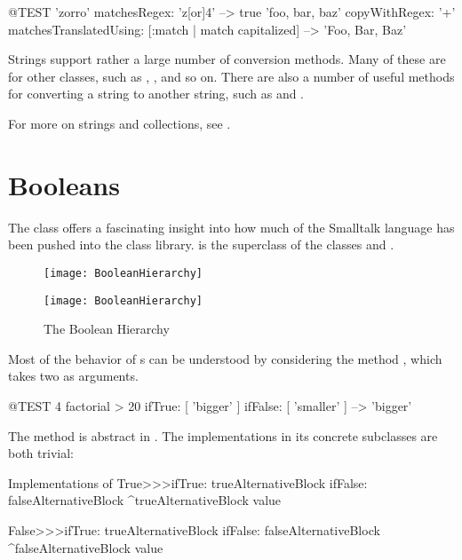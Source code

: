 \documentclass[a4paper,10pt,twoside]{book}
\begin{document}
\begin{code}{@TEST}
'zorro' matchesRegex: 'z[or]{4}' --> true
'foo, bar, baz' copyWithRegex: '\w+' matchesTranslatedUsing: [:match | match capitalized] --> 'Foo, Bar, Baz'
\end{code}

Strings support rather a large number of conversion methods.
Many of these are  for other classes, such as , , and so on.
There are also a number of useful methods for converting a string to another string, such as  and .

For more on strings and collections, see .


\section{Booleans}

The class  offers a fascinating insight into how much of the Smalltalk language has been pushed into the class library.
 is the  superclass of the  classes  and .

\begin{figure}[ht]
\ifluluelse
	{\centerline {\texttt{[image: BooleanHierarchy]}}}
	{\centerline {\texttt{[image: BooleanHierarchy]}}}
\caption{The Boolean Hierarchy \label{fig:booleans}}
\end{figure}

Most of the behavior of s can be understood by considering the method , which takes two  as arguments.

\begin{code}{@TEST}
4 factorial > 20 ifTrue: [ 'bigger' ] ifFalse: [ 'smaller' ] --> 'bigger'
\end{code}

The method is abstract in .
The implementations in its concrete subclasses are both trivial:

\begin{method}{Implementations of }
True>>>ifTrue: trueAlternativeBlock ifFalse: falseAlternativeBlock 
    ^trueAlternativeBlock value

False>>>ifTrue: trueAlternativeBlock ifFalse: falseAlternativeBlock 
    ^falseAlternativeBlock value
\end{method}
\end{document}
